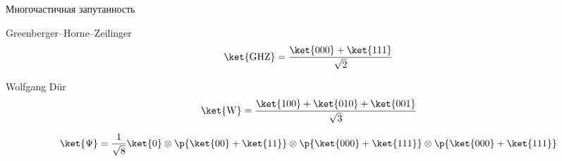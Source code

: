 \begin{frame}{Многочастичная запутанность}

Greenberger–Horne–Zeilinger
$$\ket{\mathrm{GHZ}} = \frac{\ket{000} + \ket{111}}{\sqrt{2}}$$

Wolfgang D\"ur
$$\ket{\mathrm{W}} = \frac{\ket{100} + \ket{010} +  \ket{001}}{\sqrt{3}}$$

$$
  \ket{\Psi}
  = \frac{1}{\sqrt{8}}
  \ket{0}
  \otimes
  \p{\ket{00} + \ket{11}}
  \otimes
  \p{\ket{000} + \ket{111}}
  \otimes
  \p{\ket{000} + \ket{111}}
$$
\end{frame}


% 
